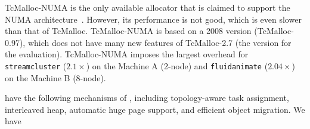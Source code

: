  TcMalloc-NUMA is the only available allocator that is claimed to support the NUMA architecture~\cite{tcmallocnew}. However, its performance is not good, which is even slower than that of TcMalloc. TcMalloc-NUMA is based on a 2008 version (TcMalloc-0.97), which does not have many new features of TcMalloc-2.7 (the version for the evaluation). TcMalloc-NUMA imposes the largest overhead for \texttt{streamcluster} ($2.1\times$) on the Machine A (2-node) and \texttt{fluidanimate} ($2.04\times$) on the Machine B (8-node). 
 
 
 have the following mechanisms of \NM{}, including topology-aware task assignment, interleaved heap, automatic huge page support, and efficient object migration. We have     
  




